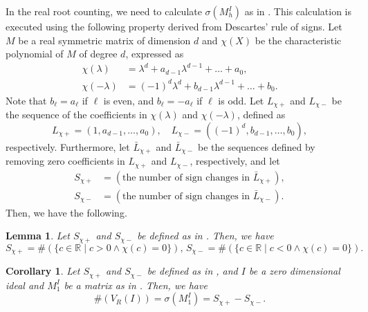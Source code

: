 \documentclass{birkjour}
\theoremstyle{plain}
\newtheorem{lemma}[theorem]{Lemma}
\newtheorem{corollary}[theorem]{Corollary}
\theoremstyle{definition}
\newcommand{\R}[0]{\mathbb{R}}
\newcommand{\Lplus}[1]{L_{{#1}+}}
\newcommand{\Lminus}[1]{L_{{#1}-}}
\newcommand{\Lbarplus}[1]{\bar{L}_{{#1}+}}
\newcommand{\Lbarminus}[1]{\bar{L}_{{#1}-}}
\newcommand{\Splus}[1]{S_{{#1}+}}
\newcommand{\Sminus}[1]{S_{{#1}-}}
\begin{document}
    In the real root counting, we need to calculate $\sigma(M_h^I)$ as in 
    . This calculation is executed using 
    the following property \cite{wei1998} derived from Descartes' rule of signs.
    Let $M$ be a real symmetric matrix of dimension $d$ and 
    $\chi(X)$ be the characteristic polynomial of $M$ of degree $d$,
    expressed as
    \[
        \begin{split}
            \chi(\lambda) &= \lambda^d+a_{d-1}\lambda^{d-1}+{\ldots}+a_0,\\
            \chi(-\lambda) &= (-1)^d\lambda^d+b_{d-1}\lambda^{d-1}+{\ldots}+b_0.
        \end{split}
    \]
    Note that $b_\ell=a_\ell$ if $\ell$ is even, and $b_\ell=-a_\ell$ if $\ell$
    is odd. 
    Let $\Lplus{\chi}$ and $\Lminus{\chi}$ be the sequence of the coefficients
    in $\chi(\lambda)$ and $\chi(-\lambda)$, defined as
    \begin{equation}
        \label{eq:L+-}
        \Lplus{\chi}=(1,a_{d-1},\dots,a_0),\quad
        \Lminus{\chi}=((-1)^d,b_{d-1},\dots,b_0),
    \end{equation}
    respectively.
    Furthermore, let $\Lbarplus{\chi}$ and $\Lbarminus{\chi}$ be the sequences
    defined by removing zero coefficients in $\Lplus{\chi}$ and
    $\Lminus{\chi}$, respectively, and let
    \begin{equation}
        \label{eq:S+-}
        \begin{split}
            \Splus{\chi} &= (\text{the number of sign changes in $\Lbarplus{\chi}$}), \\
            \Sminus{\chi} &= (\text{the number of sign changes in $\Lbarminus{\chi}$}).
        \end{split}
    \end{equation}
    Then, we have the following.

    \begin{lemma}
        Let $\Splus{\chi}$ and $\Sminus{\chi}$ be defined as in .
        Then, we have
        \[
                \Splus{\chi} = \#(\{c\in\R\mid c>0\land \chi(c)=0\}),\,
                \Sminus{\chi} = \#(\{c\in\R\mid c<0\land \chi(c)=0\}).
        \]
    \end{lemma}

    \begin{corollary}
        \label{cor:signature}
        Let $\Splus{\chi}$ and $\Sminus{\chi}$ be defined as in ,
        and
        $I$ be a zero dimensional ideal and
        $M_1^I$ be a matrix as in .
        Then, we have 
        \begin{equation}
            \label{eq:signature}
            {\#}(V_{R}(I))=\sigma(M^I_1)=\Splus{\chi}-\Sminus{\chi}.
        \end{equation}
    \end{corollary}
\end{document}
